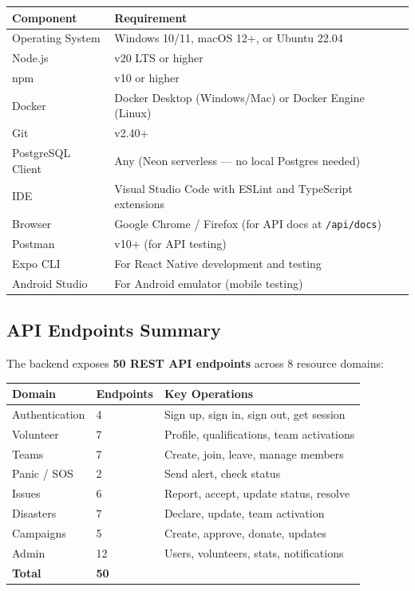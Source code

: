 \documentclass[12pt,a4paper]{article}
\begin{document}
\vspace{4pt}
\begin{center}
\renewcommand{\arraystretch}{1.35}
\begin{tabular}{@{} L{3.6cm} L{9.8cm} @{}}
\toprule
{}
\textbf{Component} & \textbf{Requirement} \\
\midrule
Operating System  & Windows 10/11, macOS 12+, or Ubuntu 22.04 \\
Node.js           & v20 LTS or higher \\
npm               & v10 or higher \\
Docker            & Docker Desktop (Windows/Mac) or Docker Engine (Linux) \\
Git               & v2.40+ \\
PostgreSQL Client & Any (Neon serverless --- no local Postgres needed) \\
IDE               & Visual Studio Code with ESLint and TypeScript extensions \\
Browser           & Google Chrome / Firefox (for API docs at \texttt{/api/docs}) \\
Postman           & v10+ (for API testing) \\
Expo CLI          & For React Native development and testing \\
Android Studio    & For Android emulator (mobile testing) \\
\bottomrule
\end{tabular}
\end{center}

\subsection{API Endpoints Summary}

The backend exposes \textbf{50 REST API endpoints} across 8 resource domains:

\vspace{4pt}
\begin{center}
\renewcommand{\arraystretch}{1.35}
\begin{tabular}{@{} L{3.4cm} C{2cm} L{7.4cm} @{}}
\toprule
{}
\textbf{Domain} & \textbf{Endpoints} & \textbf{Key Operations} \\
\midrule
Authentication  & 4  & Sign up, sign in, sign out, get session \\
Volunteer       & 7  & Profile, qualifications, team activations \\
Teams           & 7  & Create, join, leave, manage members \\
Panic / SOS     & 2  & Send alert, check status \\
Issues          & 6  & Report, accept, update status, resolve \\
Disasters       & 7  & Declare, update, team activation \\
Campaigns       & 5  & Create, approve, donate, updates \\
Admin           & 12 & Users, volunteers, stats, notifications \\
\midrule
\textbf{Total}  & \textbf{50} & \\
\bottomrule
\end{tabular}
\end{center}
\end{document}
